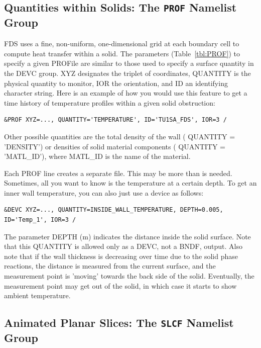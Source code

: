 \documentclass[11pt]{book}
\begin{document}
\subsection{Quantities within Solids: The \texorpdfstring{{\tt PROF}}{PROF} Namelist Group}%
\label{info:PROF}

FDS uses a fine, non-uniform, one-dimensional grid at each boundary
cell to compute heat transfer within a solid. The parameters
(Table~\ref{tbl:PROF}) to specify a given {\ct PROF}ile are similar to
those used to specify a surface quantity in the {\ct DEVC} group. {\ct
XYZ} designates the triplet of coordinates, {\ct QUANTITY} is the
physical quantity to monitor, {\ct IOR} the orientation,
and {\ct ID} an identifying character string. Here is an example of
how you would use this feature to get a time history of temperature
profiles within a given solid obstruction:

\footnotesize
\begin{verbatim}
&PROF XYZ=..., QUANTITY='TEMPERATURE', ID='TU1SA_FDS', IOR=3 /
\end{verbatim} \normalsize

\noindent
Other possible quantities are the total density of the wall ({\ct
QUANTITY = 'DENSITY'}) or densities of solid material components ({\ct
QUANTITY = 'MATL\_ID'}), where {\ct MATL\_ID} is the name of the
material.

Each {\ct PROF} line creates a separate file. This may be more than is
needed. Sometimes, all you want to know is the temperature at a
certain depth. To get an inner wall temperature, you can also just use
a device as follows:

\footnotesize
\begin{verbatim}
&DEVC XYZ=..., QUANTITY=INSIDE_WALL_TEMPERATURE, DEPTH=0.005, ID='Temp_1', IOR=3 /
\end{verbatim} \normalsize

\noindent
The parameter {\ct DEPTH} (m) indicates the distance inside the solid surface.
Note that this {\ct QUANTITY} is allowed only as a {\ct DEVC}, not a
{\ct BNDF}, output. Also note that if the wall thickness is decreasing
over time due to the solid phase reactions, the distance is
measured from the current surface, and the measurement point is
'moving' towards the back side of the solid. Eventually, the
measurement point may get out of the solid, in which case it starts to
show ambient temperature.


\subsection{Animated Planar Slices: The \texorpdfstring{{\tt SLCF}}{SLCF} Namelist Group}%
\label{info:SLCF}
\end{document}
